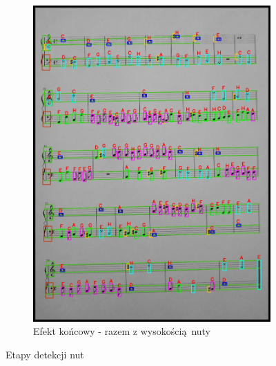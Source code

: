 \documentclass[12pt]{article}
\begin{document}
\begin{figure}[h!]
\begin{subfigure}[b]{0.32\linewidth}
				\includegraphics[width=\linewidth]{zdj/step_6.jpg}
				\caption{Efekt końcowy - razem z wysokością nuty}
			\end{subfigure}
			\label{fig:nuty}
			\caption{Etapy detekcji nut}
		\end{figure}
	
\end{document}
